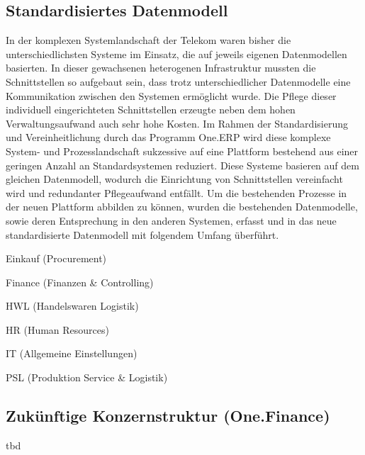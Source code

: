 \subsection{Standardisiertes Datenmodell}
In der komplexen Systemlandschaft der Telekom waren bisher die unterschiedlichsten Systeme im Einsatz, die auf jeweils eigenen Datenmodellen basierten. 
In dieser gewachsenen heterogenen Infrastruktur mussten die Schnittstellen so aufgebaut sein, dass trotz unterschiedlicher Datenmodelle eine Kommunikation zwischen den Systemen ermöglicht wurde. Die Pflege dieser individuell eingerichteten Schnittstellen erzeugte neben dem hohen Verwaltungsaufwand auch sehr hohe Kosten.
Im Rahmen der Standardisierung und Vereinheitlichung durch das Programm One.ERP wird diese komplexe System- und Prozesslandschaft sukzessive auf eine Plattform bestehend aus einer geringen Anzahl an Standardsystemen reduziert. Diese Systeme basieren auf dem gleichen Datenmodell, wodurch die Einrichtung von Schnittstellen vereinfacht wird und redundanter Pflegeaufwand entfällt.
Um die bestehenden Prozesse in der neuen Plattform abbilden zu können, wurden die bestehenden Datenmodelle, sowie deren Entsprechung in den anderen Systemen, erfasst und in das neue standardisierte Datenmodell mit folgendem Umfang überführt.
\begin{compactitem}    
\item    Einkauf (Procurement)
\item    Finance (Finanzen \& Controlling)
\item    HWL (Handelswaren Logistik)
\item    HR (Human Resources)
\item    IT (Allgemeine Einstellungen)
\item    PSL (Produktion Service \& Logistik)
\end{compactitem}

\subsection{Zukünftige Konzernstruktur (One.Finance)}
tbd

